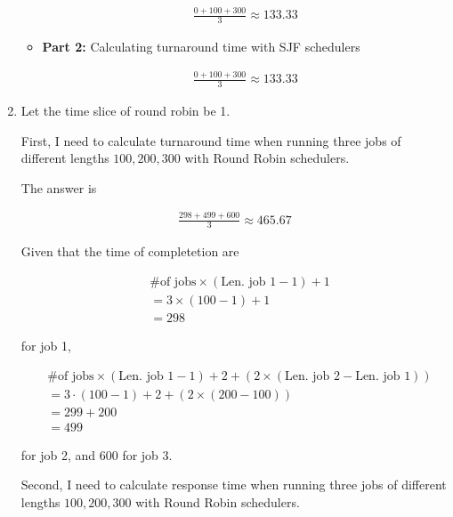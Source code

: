\documentclass[12pt]{article}
\begin{document}
\begin{enumerate}[1.]
\begin{itemize}
        \bigskip

        \begin{align}
            \frac{0 + 100 + 300}{3} \approx 133.33
        \end{align}

        \item \textbf{Part 2:} Calculating turnaround time with SJF schedulers

        \begin{align}
            \frac{0 + 100 + 300}{3} \approx 133.33
        \end{align}

    \end{itemize}

    \item
    \setcounter{equation}{0}
    Let the time slice of round robin be 1.

    \bigskip

    First, I need to calculate turnaround time when running three jobs of different lengths
    $100, 200, 300$ with Round Robin schedulers.

    \bigskip

    The answer is

    \begin{align}
        \frac{298 + 499 + 600}{3} \approx 465.67
    \end{align}

    Given that the time of completetion are

    \begin{align}
        &\text{\# of jobs} \times (\text{Len. job 1} - 1) + 1\\
        &= 3 \times (100 - 1) + 1\\
        &= 298
    \end{align}

    for job 1,

    \begin{align}
        &\text{\# of jobs} \times (\text{Len. job 1} - 1) + 2 + (2 \times (\text{Len. job 2} - \text{Len. job 1}))\\
        &= 3 \cdot (100 - 1) + 2 + (2 \times (200 - 100))\\
        &= 299 + 200\\
        &= 499
    \end{align}

    for job 2, and 600 for job 3.

    \bigskip

    Second, I need to calculate response time when running three jobs of different lengths
    $100, 200, 300$ with Round Robin schedulers.


\end{enumerate}
\end{document}
